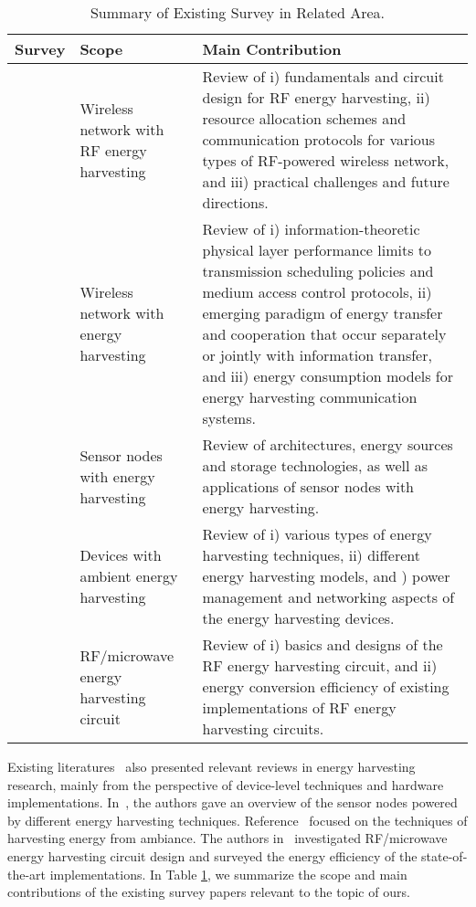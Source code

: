 \documentclass[twocolumn,10pt]{IEEEtran}
\begin{document}
\begin{table}
\footnotesize
\centering
\caption{\footnotesize  Summary of Existing Survey in Related Area.} \label{Survey_comparison}
\begin{tabular}{|p{0.7cm}|p{1.5cm}|p{5.5cm}|} 
\hline
\footnotesize  Survey & Scope & Main Contribution \\
\hline
\cite{X.LuSurvey} &  Wireless network with RF energy harvesting & Review of i) fundamentals and circuit design for RF energy harvesting, ii) resource allocation schemes and communication protocols for various types of RF-powered wireless network, and iii) practical challenges and future directions. \\
\hline
\cite{S.2015Ulukus} & Wireless network with energy harvesting  & Review of i) information-theoretic physical layer performance limits to transmission scheduling policies and medium access control protocols, ii) emerging paradigm of energy transfer and cooperation that occur separately or jointly with information transfer, and iii) energy consumption models for energy harvesting communication systems. \\
\hline
\cite{S.2011Sudevalayam} & Sensor nodes with energy harvesting & Review of architectures, energy sources and storage technologies, as well as applications of sensor nodes with energy harvesting. \\
\hline 
 \cite{V.2014Prasad} & Devices with ambient energy harvesting   & Review of i) various types
 of energy harvesting techniques, ii) different energy harvesting models, and ) power management and networking
 aspects of the energy harvesting devices. \\
\hline
 \cite{R.2014Valenta} & RF/microwave energy harvesting circuit &  Review of i) basics and designs of the RF energy harvesting circuit, and ii) energy conversion efficiency of existing implementations of RF energy harvesting circuits.  \\
 \hline
\end{tabular}
\end{table}

Existing literatures~\cite{S.2011Sudevalayam,R.2014Valenta,V.2014Prasad} also presented relevant reviews in energy harvesting research, mainly from the perspective of device-level techniques and hardware implementations. In~\cite{S.2011Sudevalayam}, the authors gave an overview of the sensor nodes powered by different energy harvesting techniques. Reference~\cite{V.2014Prasad} focused on the techniques of harvesting energy from ambiance. The authors in~\cite{R.2014Valenta} investigated RF/microwave energy harvesting circuit design and surveyed the energy efficiency of the state-of-the-art implementations.   
In Table \ref{Survey_comparison}, we summarize the scope and main contributions of the existing survey papers relevant to the topic of ours. 
\end{document}
